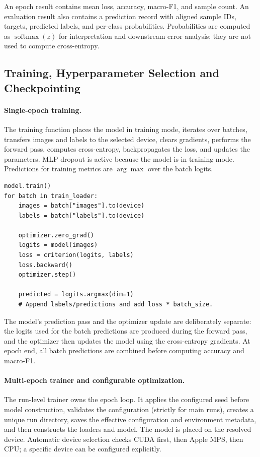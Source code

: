 \documentclass[11pt,a4paper]{article}
\begin{document}
An epoch result contains mean loss, accuracy, macro-F1, and sample count. An evaluation result also contains a prediction record with aligned sample IDs, targets, predicted labels, and per-class probabilities. Probabilities are computed as \(\operatorname{softmax}(z)\) for interpretation and downstream error analysis; they are not used to compute cross-entropy.

\subsection{Training, Hyperparameter Selection and Checkpointing}

\paragraph{Single-epoch training.} The training function places the model in training mode, iterates over batches, transfers images and labels to the selected device, clears gradients, performs the forward pass, computes cross-entropy, backpropagates the loss, and updates the parameters. MLP dropout is active because the model is in training mode. Predictions for training metrics are \(\arg\max\) over the batch logits.

\begin{lstlisting}[caption={Essential update sequence for one training batch.},label={lst:train-step}]
model.train()
for batch in train_loader:
    images = batch["images"].to(device)
    labels = batch["labels"].to(device)

    optimizer.zero_grad()
    logits = model(images)
    loss = criterion(logits, labels)
    loss.backward()
    optimizer.step()

    predicted = logits.argmax(dim=1)
    # Append labels/predictions and add loss * batch_size.
\end{lstlisting}

The model's prediction pass and the optimizer update are deliberately separate: the logits used for the batch predictions are produced during the forward pass, and the optimizer then updates the model using the cross-entropy gradients. At epoch end, all batch predictions are combined before computing accuracy and macro-F1.

\paragraph{Multi-epoch trainer and configurable optimization.} The run-level trainer owns the epoch loop. It applies the configured seed before model construction, validates the configuration (strictly for main runs), creates a unique run directory, saves the effective configuration and environment metadata, and then constructs the loaders and model. The model is placed on the resolved device. Automatic device selection checks CUDA first, then Apple MPS, then CPU; a specific device can be configured explicitly.
\end{document}
